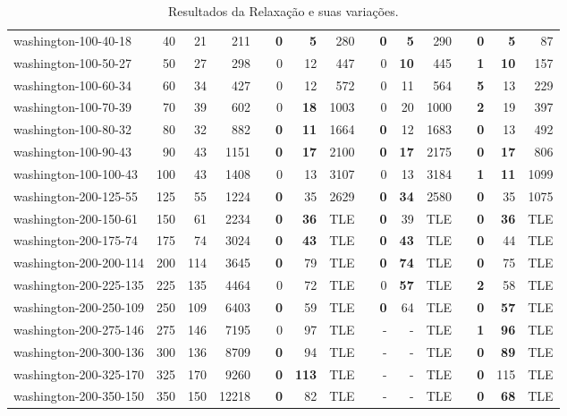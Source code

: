 \begin{table}[!ht]
{\begin{tabular}{lrrrrrrrrrrrlrrr}
washington-100-40-18 & 40 & 21 & 211 &  & \textbf{0} & \textbf{5} & 280 &  & \textbf{0} & \textbf{5} & 290 &  & \textbf{0} & \textbf{5} & 87 \\
washington-100-50-27 & 50 & 27 & 298 &  & 0 & 12 & 447 &  & 0 & \textbf{10} & 445 &  & \textbf{1} & \textbf{10} & 157 \\
washington-100-60-34 & 60 & 34 & 427 &  & 0 & 12 & 572 &  & 0 & 11 & 564 &  & \textbf{5} & 13 & 229 \\
washington-100-70-39 & 70 & 39 & 602 &  & 0 & \textbf{18} & 1003 &  & 0 & 20 & 1000 &  & \textbf{2} & 19 & 397 \\
washington-100-80-32 & 80 & 32 & 882 &  & \textbf{0} & \textbf{11} & 1664 &  & \textbf{0} & 12 & 1683 &  & \textbf{0} & 13 & 492 \\
washington-100-90-43 & 90 & 43 & 1151 &  & \textbf{0} & \textbf{17} & 2100 &  & \textbf{0} & \textbf{17} & 2175 &  & \textbf{0} & \textbf{17} & 806 \\
washington-100-100-43 & 100 & 43 & 1408 &  & 0 & 13 & 3107 &  & 0 & 13 & 3184 &  & \textbf{1} & \textbf{11} & 1099 \\ \hline
washington-200-125-55 & 125 & 55 & 1224 &  & \textbf{0} & 35 & 2629 &  & \textbf{0} & \textbf{34} & 2580 &  & \textbf{0} & 35 & 1075 \\
washington-200-150-61 & 150 & 61 & 2234 &  & \textbf{0} & \textbf{36} & TLE &  & \textbf{0} & 39 & TLE &  & \textbf{0} & \textbf{36} & TLE \\
washington-200-175-74 & 175 & 74 & 3024 &  & \textbf{0} & \textbf{43} & TLE &  & \textbf{0} & \textbf{43} & TLE &  & \textbf{0} & 44 & TLE \\
washington-200-200-114 & 200 & 114 & 3645 &  & \textbf{0} & 79 & TLE &  & \textbf{0} & \textbf{74} & TLE &  & \textbf{0} & 75 & TLE \\
washington-200-225-135 & 225 & 135 & 4464 &  & 0 & 72 & TLE &  & 0 & \textbf{57} & TLE &  & \textbf{2} & 58 & TLE \\
washington-200-250-109 & 250 & 109 & 6403 &  & \textbf{0} & 59 & TLE &  & \textbf{0} & 64 & TLE &  & \textbf{0} & \textbf{57} & TLE \\
washington-200-275-146 & 275 & 146 & 7195 &  & 0 & 97 & TLE &  & - & - & TLE &  & \textbf{1} & \textbf{96} & TLE \\
washington-200-300-136 & 300 & 136 & 8709 &  & \textbf{0} & 94 & TLE &  & - & - & TLE &  & \textbf{0} & \textbf{89} & TLE \\
washington-200-325-170 & 325 & 170 & 9260 &  & \textbf{0} & \textbf{113} & TLE &  & - & - & TLE &  & \textbf{0} & 115 & TLE \\
washington-200-350-150 & 350 & 150 & 12218 &  & \textbf{0} & 82 & TLE &  & - & - & TLE &  & \textbf{0} & \textbf{68} & TLE \\ \hline
\end{tabular}%
}
\caption{Resultados da Relaxação {\rlu} e suas variações.}
\label{tab:rl-sp}
\end{table}

